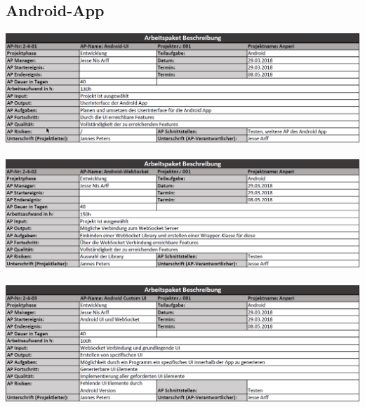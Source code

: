 \documentclass{scrartcl}
\begin{document}
\subsection{Android-App}
\includegraphics[scale=0.6]{ArbeitsPakete/AP2-4-01.png}
\\
\\
\includegraphics[scale=0.6]{ArbeitsPakete/AP2-4-02.png}
\\
\\
\includegraphics[scale=0.6]{ArbeitsPakete/AP2-4-03.png}
\end{document}
